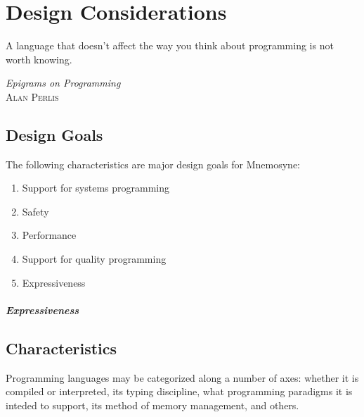 %
%
%
\chapter{Design Considerations} \label{ch:design}

\epigraph{ A language that doesn't affect the way you think about programming
           is not worth knowing. }%
         { \textit{Epigrams on Programming}~\cite{Perlis:1982:SFE:947955.1083808} \\
          \textsc{Alan Perlis}}


\section{Design Goals} \label{sec:goals}

The following characteristics are major design goals for Mnemosyne:
\begin{enumerate}
    \item Support for systems programming
    \item Safety
    \item Performance
    \item Support for quality programming
    \item Expressiveness
\end{enumerate}

\paragraph{Expressiveness}
%

\section{Characteristics} \label{sec:characteristics}

Programming languages may be categorized along a number of axes: whether it is compiled or interpreted, its typing discipline, what programming paradigms it is inteded to support, its method of memory management, and others.

